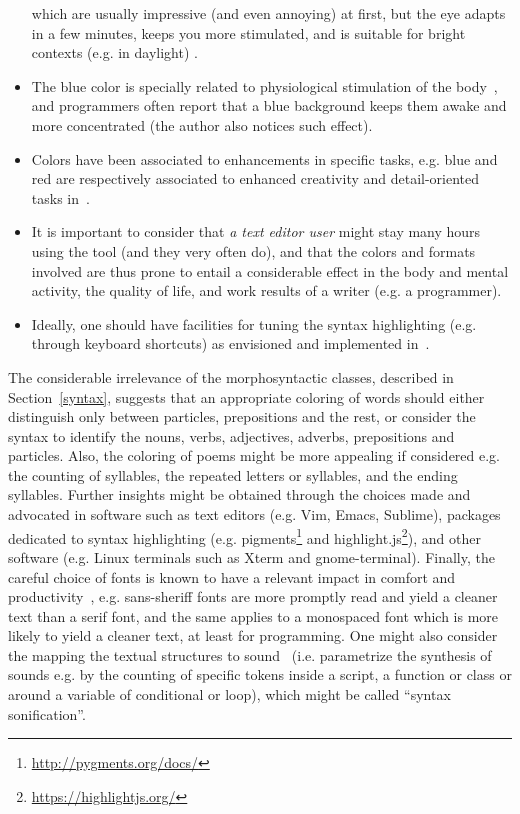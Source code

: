 \begin{itemize}
  which are usually impressive (and even annoying) at first,
  but the eye adapts in a few minutes, keeps you more stimulated,
    and is suitable for bright contexts (e.g. in daylight) .
\item The blue color is specially related to physiological
  stimulation of the body~\cite{blue,blue2},
    and programmers often report that a blue background keeps them
    awake and more concentrated (the author also notices such effect).
  \item Colors have been associated to enhancements in specific tasks,
    e.g. blue and red are respectively associated to enhanced
    creativity and detail-oriented tasks in~\cite{blue}.
  \item It is important to consider that \emph{a text editor user} might 
    stay many hours using the tool (and they very often do),
    and that the colors and formats involved are
  thus prone to entail a considerable effect in the body and mental
    activity, the quality of life, and work results of a writer
    (e.g. a programmer).
  \item Ideally, one should have facilities for tuning 
    the syntax highlighting (e.g. through keyboard shortcuts)
  as envisioned and implemented in~\cite{vim}.
\end{itemize}

The considerable irrelevance of the morphosyntactic classes,
described in Section~\ref{syntax}, suggests that an appropriate coloring
of words should
either distinguish only between particles, prepositions and the rest,
or consider the syntax to identify the nouns, verbs, adjectives, adverbs,
prepositions and particles.
Also, the coloring of poems might be more appealing if considered
e.g. the counting of syllables, the repeated letters or syllables,
and the ending syllables.
Further insights might be obtained through the
choices made and advocated in software such as text editors
(e.g. Vim, Emacs, Sublime),
packages dedicated to syntax highlighting (e.g.
pigments\footnote{\url{http://pygments.org/docs/}} and 
highlight.js\footnote{\url{https://highlightjs.org/}}),
and
other software (e.g. Linux terminals such as Xterm and gnome-terminal).
Finally, the careful choice of fonts is known to have
a relevant impact in comfort and productivity~\cite{fonts},
e.g. sans-sheriff fonts are more promptly read and yield a cleaner
text than a serif font, and the same applies to a monospaced font
which is more likely to yield a cleaner text, at least for programming.
One might also 
consider the mapping the textual structures
to sound~\cite{mass} (i.e. parametrize the synthesis of sounds e.g. 
by the counting of specific tokens inside a script, a function or
class or around a variable of conditional or
loop), which might be called ``syntax sonification''.

